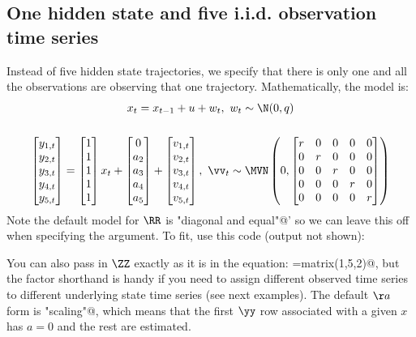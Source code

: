 \subsection{One hidden state and five i.i.d. observation time series}
Instead of five hidden state trajectories, we specify that there is only one and all the observations are observing that one trajectory. Mathematically, the model is:
\begin{gather*}
x_{t}= x_{t-1} + u + w_{t}, \text{ } w_t \sim \N(0,q)  \\  \\
\begin{bmatrix}y_{1,t}\\y_{2,t}\\y_{3,t}\\y_{4,t}\\y_{5,t}\end{bmatrix}
= \begin{bmatrix}1\\1\\1\\1\\1\end{bmatrix}
x_{t} + \begin{bmatrix}0\\a_2\\a_3\\a_4\\a_5\end{bmatrix}
+ \begin{bmatrix}v_{1,t}\\ v_{2,t}\\ v_{3,t}\\ v_{4,t}\\ v_{5,t}\end{bmatrix},
 \textrm{ } \vv_t \sim \MVN\begin{pmatrix}0,\begin{bmatrix}r&0&0&0&0\\0&r&0&0&0\\0&0&r&0&0\\0&0&0&r&0\\0&0&0&0&r\end{bmatrix} \end{pmatrix}  \\
\end{gather*}
Note the default model for $\RR$ is \verb@"diagonal and equal"@' so we can leave this off when specifying the \verb@model@ argument.  To fit, use this code (output not shown):

You can also pass in $\ZZ$ exactly as it is in the equation: \verb@Z=matrix(1,5,2)@, but the factor shorthand is handy if you need to assign different observed time series to different underlying state time series (see next examples).   The default $\aa$ form is \verb@"scaling"@, which means that the first $\yy$ row associated with a given $x$ has $a=0$ and the rest are estimated.

